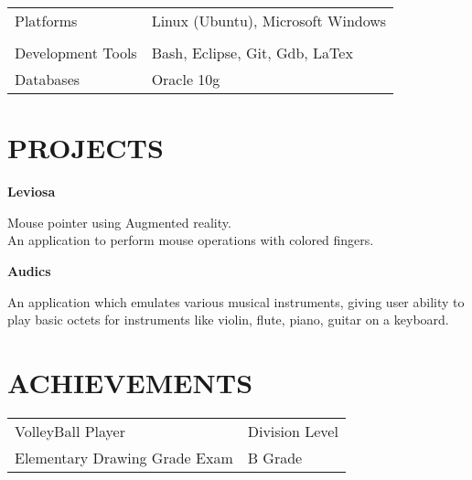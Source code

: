 \documentclass{res}
\begin{document}
\begin{resume}
\begin{tabular}{l l}
		Platforms & Linux (Ubuntu), Microsoft \textsuperscript{\textregistered} Windows\textsuperscript{\textregistered}\\\\

		Development Tools & Bash, Eclipse, Git, Gdb, LaTex\\

		Databases & Oracle\textsuperscript{\textregistered} 10g

	\end{tabular}      
           

\section{PROJECTS}
   \vspace{-0.1in}	
   \begin{tabbing}
		{\bf Leviosa}
   \end{tabbing}\vspace{-20pt}      %
    Mouse pointer using Augmented reality.\\An application to perform mouse operations with colored fingers.
   
   \begin{tabbing}
		{\bf Audics}
   \end{tabbing}\vspace{-20pt}
    An application which emulates various musical instruments, giving user ability to play basic octets for instruments like violin, flute, piano, guitar on a keyboard.
   
          
\section{ACHIEVEMENTS}

	\begin{tabular}{l l}

		{VolleyBall Player} & Division Level\\
		
		{Elementary Drawing Grade Exam} & B Grade\\
		

\end{tabular}
\end{resume}
\end{document}
